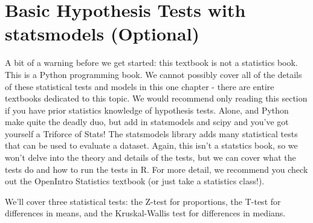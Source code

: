 \section{Basic Hypothesis Tests with statsmodels (Optional)}
A bit of a warning before we get started: this textbook is not a statistics book. This is a Python programming book. We cannot possibly cover all of the details of these statistical tests and models in this one chapter - there are entire textbooks dedicated to this topic. We would recommend only reading this section if you have prior statistics knowledge of hypothesis tests.
Alone,  and Python make quite the deadly duo, but add in statsmodels and scipy and you've got yourself a Triforce of Stats! The statsmodels library adds many statistical tests that can be used to evaluate a dataset. Again, this isn't a statstics book, so we won't delve into the theory and details of the tests, but we can cover what the tests do and how to run the tests in R. For more detail, we recommend you check out the OpenIntro Statistics textbook (or just take a statistics class!).\par
We'll cover three statistical tests: the Z-test for proportions, the T-test for differences in means, and the Kruskal-Wallis test for differences in medians.

